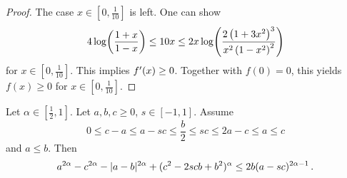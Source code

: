 \begin{proof}
	The case $x \in [0,\frac1{10}]$ is left.
	One can show
	\begin{align*}
		 4 \log\!\left( \frac{1+x}{1-x} \right)  \leq 10x \leq 2 x \log\!\left( \frac{2\left( 1+3x^2 \right)^3}{x^2\left( 1-x^2 \right)^2} \right)
	\end{align*}
	for $x \in [0,\frac1{10}]$.
	This implies $f^\prime(x) \geq 0$. Together with $f(0)=0$, this yields $f(x)\geq 0$ for $x \in [0,\frac1{10}]$.
\end{proof}
%
\begin{lemma}\label{lmm:bgeqascandaleqb}
	Let $\alpha\in[\frac12,1]$.
	Let $a,b,c\geq0$, $s\in[-1,1]$.
	Assume 
	\begin{equation*}
		0 \leq c - a \leq a -sc \leq \frac b2 \leq sc \leq 2a-c \leq a \leq c
	\end{equation*}
	and
	$a \leq b$.
	Then
	\begin{equation*}
		a^{2\alpha}-c^{2\alpha}-|a-b|^{2\alpha}+(c^2 - 2 s c b + b^2)^\alpha 
		\leq 
		2 b (a-sc)^{2\alpha-1}
		\, .
	\end{equation*}
\end{lemma}
%
